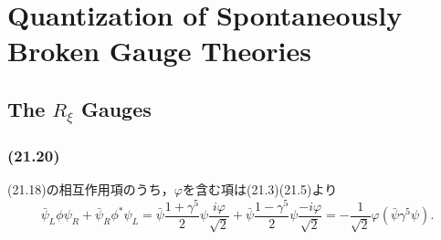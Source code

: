 \chapter{Quantization of Spontaneously Broken Gauge Theories}
\section{The $R_\xi$ Gauges}
\subsection{(21.20)}
(21.18)の相互作用項のうち，\(\varphi\)を含む項は(21.3)(21.5)より
\[
\bar\psi_L \phi \psi_R + \bar\psi_R \phi^\ast \psi_L
= \bar\psi \frac{1+\gamma^5}{2} \psi \frac{i\varphi}{\sqrt{2}}
+ \bar\psi \frac{1-\gamma^5}{2} \psi \frac{-i\varphi}{\sqrt{2}}
= - \frac{1}{\sqrt{2}} \varphi (\bar\psi\gamma^5\psi) .
\]


